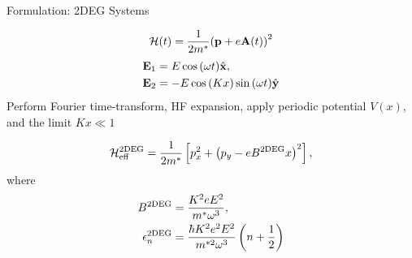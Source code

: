 \documentclass[xcolor=dvipsnames,10pt,aspectratio=169]{beamer}
\let\oldhat\hat
\renewcommand{\hat}[1]{\oldhat{\mathbf{#1}}}
\renewcommand{\vec}[1]{\mathbf{#1}}
\newcommand{\ham}{\mathcal{H}}
\newcommand{\FO}{Formulation}
\begin{document}
  \begin{frame}{\FO: 2DEG Systems}

    \begin{equation}
      \small
      \ham (t) = \dfrac{1}{2m^*} {\left( \vec{p} +e \vec{A}(t)\right)}^2
    \end{equation}
    \begin{align}
      \small
      \vec{E}_1 &= E\cos{(\omega t)} \hat{x},\nonumber \\
      \vec{E}_2 &= -E\cos{(Kx)}\sin{(\omega t)} \hat{y}
    \end{align}
    Perform Fourier time-transform, HF expansion, apply periodic potential $V(x)$, and the limit $Kx\ll1$

    \begin{equation}
      \small
      \ham_{\text{eff}}^{\text{2DEG}} = \frac{1}{2m^*} \left[ p_x^2 + {\left(p_y - eB^{\text{2DEG}}x \right)}^2\right],
    \end{equation}
    where
    \begin{align}
      \small
      B^{\text{2DEG}} &= \frac{K^2 e E^2}{m^* \omega^3}, \\
      \epsilon_n^{\text{2DEG}} &= \dfrac{\hbar K^2 e^2 E^2}{m^{*2} \omega^3} \left( n+ \dfrac{1}{2}\right)
    \end{align}

  \end{frame}
\end{document}
